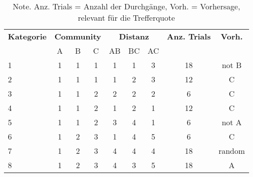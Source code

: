 
\begin{table}[h]
\centering
\captionsetup{justification=centering, margin = 1cm}
\begin{tabular}{l c c c c c c c c}
\hline
\textbf{Kategorie} & \multicolumn{3}{c}{\textbf{Community}} &  \multicolumn{3}{c}{\textbf{Distanz}} & \textbf{Anz. Trials} & \textbf{Vorh.}\\
& A & B & C & AB & BC & AC \\
\hline
1 & 1 & 1 & 1 & 1 & 1 & 3 & 18 & not B\\
2 & 1 & 1 & 1 & 1 & 2 & 3 & 12 & C\\
3 & 1 & 1 & 2 & 2 & 2 & 2 & 6 & C\\
4 & 1 & 1 & 2 & 1 & 2 & 1 & 12 & C\\
5 & 1 & 1 & 2 & 3 & 4 & 1 & 6 & not A\\
6 & 1 & 2 & 3 & 1 & 4 & 5 & 6 & C\\
7 & 1 & 2 & 3 & 4 & 4 & 4 & 18 & random\\
8 & 1 & 2 & 3 & 4 & 3 & 5 & 18 & A\\
\hline
\end{tabular}
\caption{Note. Anz. Trials = Anzahl der Durchgänge, Vorh. = Vorhersage, relevant für die Trefferquote}
\end{table}



